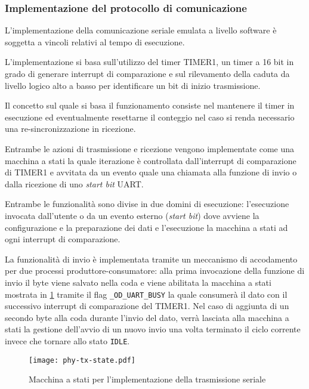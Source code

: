 \subsubsection{Implementazione del protocollo di comunicazione}

L'implementazione della comunicazione seriale emulata a livello software è soggetta a vincoli relativi al tempo di esecuzione.

L'implementazione si basa sull'utilizzo del timer TIMER1, un timer a 16 bit in grado di generare interrupt di comparazione e sul rilevamento della caduta da livello logico alto a basso per identificare un bit di inizio trasmissione.

Il concetto sul quale si basa il funzionamento consiste nel mantenere il timer in esecuzione ed eventualmente resettarne il conteggio nel caso si renda necessario una re-sincronizzazione in ricezione.

Entrambe le azioni di trasmissione e ricezione vengono implementate come una macchina a stati la quale iterazione è controllata dall'interrupt di comparazione di TIMER1 e avvitata da un evento quale una chiamata alla funzione di invio o dalla ricezione di uno \textit{start bit} UART.\@

Entrambe le funzionalità sono divise in due domini di esecuzione: l'esecuzione invocata dall'utente o da un evento esterno (\textit{start bit}) dove avviene la configurazione e la preparazione dei dati e l'esecuzione la macchina a stati ad ogni interrupt di comparazione. 

La funzionalità di invio è implementata tramite un meccanismo di accodamento per due processi produttore-consumatore: alla prima invocazione della funzione di invio il byte viene salvato nella coda e viene abilitata la macchina a stati mostrata in \cref{fig:phy-state-tx} tramite il flag \texttt{\_OD\_UART\_BUSY} la quale consumerà il dato con il successivo interrupt di comparazione del TIMER1.
Nel caso di aggiunta di un secondo byte alla coda durante l'invio del dato, verrà lasciata alla macchina a stati la gestione dell'avvio di un nuovo invio una volta terminato il ciclo corrente invece che tornare allo stato \texttt{IDLE}. 

\begin{figure}[t]
    \centering
    \texttt{[image: phy-tx-state.pdf]}
    \caption[]{Macchina a stati per l'implementazione della trasmissione seriale}\label{fig:phy-state-tx}
\end{figure}

